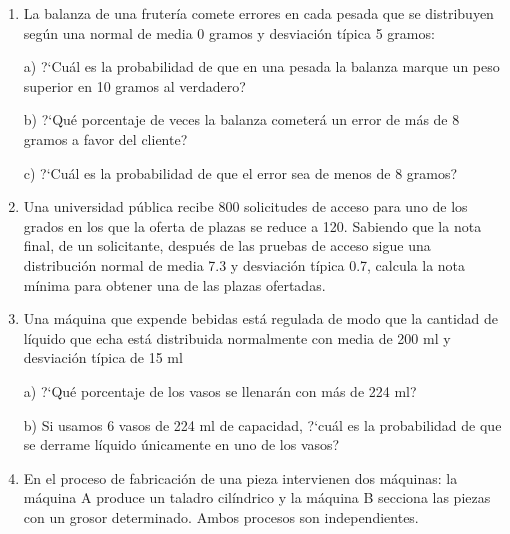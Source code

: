 \begin{adjustwidth}{20pt}{10pt}
\begin{enumerate}[PB. 1. ]
		
		
		\item 	La balanza de una frutería comete errores en cada pesada que se distribuyen según una normal de media 0 gramos y desviación típica 5 gramos:

a) ?`Cuál es la probabilidad de que en una pesada la balanza marque un peso superior en 10 gramos al verdadero?

b) ?`Qué porcentaje de veces la balanza cometerá un error de más de 8 gramos a favor del cliente?

c) ?`Cuál es la probabilidad de que el error sea de menos de 8 gramos?

		
		\hspace{-1cm}\vspace{1cm}
		
		
		\item 	Una universidad pública recibe 800 solicitudes de acceso para uno de los grados en los que la oferta de plazas se reduce a 120. Sabiendo que la nota final, de un solicitante, después de las pruebas de acceso sigue una distribución normal de media 7.3 y desviación típica 0.7, calcula la nota mínima para obtener una de las plazas ofertadas.  

		
		\hspace{-1cm}\vspace{1cm}
		

		
		
		\item 	Una máquina que expende bebidas está regulada de modo que la cantidad de líquido que echa está distribuida normalmente con media de 200 ml y desviación típica de 15 ml
		
		a) ?`Qué porcentaje de los vasos se llenarán con más de 224 ml?
		
		b) Si usamos 6 vasos de 224 ml de capacidad, ?`cuál es la probabilidad de que se derrame líquido únicamente en uno de los vasos?
		
		\hspace{-1cm}\vspace{1cm}
		
		
		
		\item 	En el proceso de fabricación de una pieza intervienen dos máquinas: la máquina A produce un taladro cilíndrico y la máquina B secciona las piezas con un grosor determinado. Ambos procesos son independientes.
		

\end{enumerate}
\end{adjustwidth}

